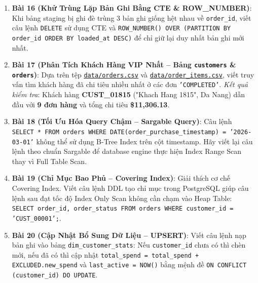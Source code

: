 \begin{baitapbox}
\begin{enumerate}
    \item \textbf{Bài 16 (Khử Trùng Lặp Bản Ghi Bằng CTE \& ROW\_NUMBER)}: Khi bảng staging bị ghi đè trùng 3 bản ghi giống hệt nhau về \texttt{order\_id}, viết câu lệnh \texttt{DELETE} sử dụng CTE và \texttt{ROW\_NUMBER() OVER (PARTITION BY order\_id ORDER BY loaded\_at DESC)} để chỉ giữ lại duy nhất bản ghi mới nhất.
    \item \textbf{Bài 17 (Phân Tích Khách Hàng VIP Nhất -- Bảng \texttt{customers} \& \texttt{orders})}: Dựa trên tệp \href{run:./data/orders.csv}{\texttt{data/orders.csv}} và \href{run:./data/order_items.csv}{\texttt{data/order\_items.csv}}, viết truy vấn tìm khách hàng đã chi tiêu nhiều nhất ở các đơn \texttt{'COMPLETED'}. \textit{Kết quả kiểm tra}: Khách hàng \textbf{CUST\_01815} ("Khach Hang 1815", Da Nang) dẫn đầu với \textbf{9 đơn hàng} và tổng chi tiêu \textbf{\$11,306.13}.
    \item \textbf{Bài 18 (Tối Ưu Hóa Query Chậm -- Sargable Query)}: Câu lệnh \texttt{SELECT * FROM orders WHERE DATE(order\_purchase\_timestamp) = '2026-03-01'} không thể sử dụng B-Tree Index trên cột timestamp. Hãy viết lại câu lệnh theo chuẩn Sargable để database engine thực hiện Index Range Scan thay vì Full Table Scan.
    \item \textbf{Bài 19 (Chỉ Mục Bao Phủ -- Covering Index)}: Giải thích cơ chế Covering Index. Viết câu lệnh DDL tạo chỉ mục trong PostgreSQL giúp câu lệnh sau đạt tốc độ Index Only Scan không cần chạm vào Heap Table: \texttt{SELECT order\_id, order\_status FROM orders WHERE customer\_id = 'CUST\_00001';}.
    \item \textbf{Bài 20 (Cập Nhật Bổ Sung Dữ Liệu -- UPSERT)}: Viết câu lệnh nạp bản ghi vào bảng \texttt{dim\_customer\_stats}: Nếu \texttt{customer\_id} chưa có thì chèn mới, nếu đã có thì cập nhật \texttt{total\_spend = total\_spend + EXCLUDED.new\_spend} và \texttt{last\_active = NOW()} bằng mệnh đề \texttt{ON CONFLICT (customer\_id) DO UPDATE}.
\end{enumerate}
\end{baitapbox}

